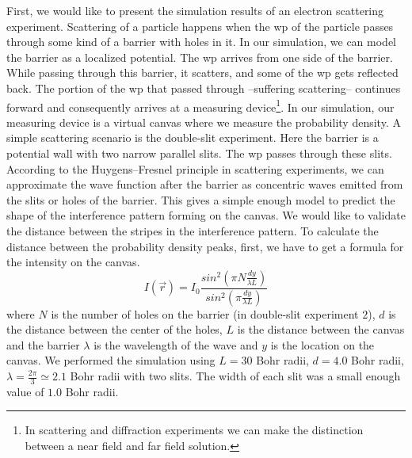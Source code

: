 First, we would like to present the simulation results of an electron scattering experiment.
Scattering of a particle happens when the \acrshort{wp} of the particle passes through some kind of a barrier with holes in it.
In our simulation, we can model the barrier as a localized potential.
The \acrshort{wp} arrives from one side of the barrier.
While passing through this barrier, it scatters, and some of the \acrshort{wp} gets reflected back.
The portion of the \acrshort{wp} that passed through --suffering scattering-- continues forward and consequently arrives at a measuring device\footnote{In scattering and diffraction experiments we can make the distinction between a near field and far field solution.}.
In our simulation, our measuring device is a virtual canvas where we measure the probability density.
A simple scattering scenario is the double-slit experiment.
Here the barrier is a potential wall with two narrow parallel slits.
The \acrshort{wp} passes through these slits.
According to the Huygens–Fresnel principle in scattering experiments, we can approximate the wave function after the barrier as concentric waves emitted from the slits or holes of the barrier.
This gives a simple enough model to predict the shape of the interference pattern forming on the canvas.
We would like to validate the distance between the stripes in the interference pattern.
To calculate the distance between the probability density peaks, first, we have to get a formula for the intensity on the canvas.
\begin{equation}
	\label{eq:Huygens}
	I(\vec{r}) = I_0 \frac{sin^2\left( \pi N \frac{dy}{\lambda L} \right)}{sin^2\left( \pi \frac{dy}{\lambda L} \right)}
\end{equation}
where $N$ is the number of holes on the barrier (in double-slit experiment $2$), $d$ is the distance between the center of the holes, $L$ is the distance between the canvas and the barrier $\lambda$ is the wavelength of the wave and $y$ is the location on the canvas.
We performed the simulation using $L = 30$ Bohr radii, $d = 4.0$ Bohr radii, $\lambda = \frac{2\pi}{3}\simeq 2.1$ Bohr radii with two slits.
The width of each slit was a small enough value of $1.0$ Bohr radii.
